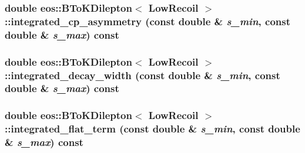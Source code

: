\label{classeos_1_1BToKDilepton_3_01LowRecoil_01_4_a13204b4a9edf339d616343b3b739fd5e}
\hypertarget{classeos_1_1BToKDilepton_3_01LowRecoil_01_4_a5fb1faf6b03885cf721cfbca5614dd84}{
\subsubsection[{integrated\_\-cp\_\-asymmetry}]{\setlength{\rightskip}{0pt plus 5cm}double eos::BToKDilepton$<$ {\bf LowRecoil} $>$::integrated\_\-cp\_\-asymmetry (const double \& {\em s\_\-min}, \/  const double \& {\em s\_\-max}) const}}
\label{classeos_1_1BToKDilepton_3_01LowRecoil_01_4_a5fb1faf6b03885cf721cfbca5614dd84}
\hypertarget{classeos_1_1BToKDilepton_3_01LowRecoil_01_4_a36eb5eb65be6edd0573f54e7295cf4da}{
\subsubsection[{integrated\_\-decay\_\-width}]{\setlength{\rightskip}{0pt plus 5cm}double eos::BToKDilepton$<$ {\bf LowRecoil} $>$::integrated\_\-decay\_\-width (const double \& {\em s\_\-min}, \/  const double \& {\em s\_\-max}) const}}
\label{classeos_1_1BToKDilepton_3_01LowRecoil_01_4_a36eb5eb65be6edd0573f54e7295cf4da}
\hypertarget{classeos_1_1BToKDilepton_3_01LowRecoil_01_4_aad855a5a327319887e700df9b190dfbb}{
\subsubsection[{integrated\_\-flat\_\-term}]{\setlength{\rightskip}{0pt plus 5cm}double eos::BToKDilepton$<$ {\bf LowRecoil} $>$::integrated\_\-flat\_\-term (const double \& {\em s\_\-min}, \/  const double \& {\em s\_\-max}) const}}
\label{classeos_1_1BToKDilepton_3_01LowRecoil_01_4_aad855a5a327319887e700df9b190dfbb}
